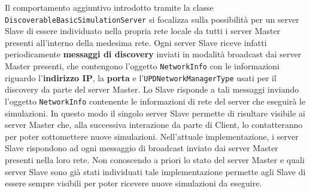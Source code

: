 Il comportamento aggiuntivo introdotto tramite la classe \texttt{DiscoverableBasicSimulationServer} si focalizza sulla possibilità per un server Slave di essere individuato nella propria rete locale da tutti i server Master
presenti all'interno della medesima rete. Ogni server Slave riceve infatti periodicamente \textbf{messaggi di discovery} inviati in modalità broadcast dai server Master presenti, che contengono l'oggetto \texttt{NetworkInfo} con le informazioni riguardo l'\textbf{indirizzo IP}, la \textbf{porta} e l'\texttt{UPDNetworkManagerType} usati per il discovery da parte del server Master. Lo Slave risponde a tali messaggi inviando l'oggetto \texttt{NetworkInfo} contenente le informazioni di rete del server che eseguirà le simulazioni. In questo modo il singolo server Slave
permette di risultare visibile ai server Master che, alla successiva interazione da parte di Client, lo contatteranno per poter sottomettere nuove simulazioni.
Nell'attuale implementazione, i server Slave rispondono ad ogni messaggio di broadcast inviato dai server Master presenti nella loro rete. Non conoscendo a priori lo stato del server Master e quali server Slave sono già stati individuati
tale implementazione permette agli Slave di essere sempre visibili per poter ricevere nuove simulazioni da eseguire.